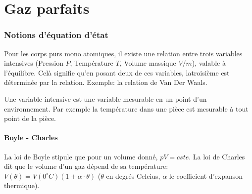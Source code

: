 






\usepackage[hideerrors]{xcolor}
\usepackage{array}
\usepackage{amsmath}
\usepackage{amssymb}
\usepackage{amsthm}
\usepackage{fancybox}
\usepackage{float}
\usepackage{colortbl}
\usepackage{graphicx}

\DeclareMathOperator{\Sur}{Sur}
\DeclareMathOperator{\In}{In}
\DeclareMathOperator{\newnull}{null}
\DeclareMathOperator{\newim}{Im}
\DeclareMathOperator{\newker}{Ker}
\DeclareMathOperator{\cof}{cof}
\DeclareMathOperator{\rang}{rang}




\part{Gaz parfaits}
\section{Notions d'équation d'état}
Pour les corps purs mono atomiques, il existe une relation entre trois variables intensives (Pression $P$, Température $T$, Volume massique $V/m$), valable à l'équilibre. Celà signifie qu'en posant deux de ces variables, latroisième est déterminée par la relation.
Exemple: la relation de Van Der Waals.

Une variable intensive est une variable mesurable en un point d'un environnement. Par exemple la température dans une pièce est mesurable à tout point de la pièce.

\subsection{Boyle - Charles}
La loi de Boyle stipule que pour un volume donné, $pV = cste$.
La loi de Charles dit que le volume d'un gaz dépend de sa température: $V(\theta) = V(0^\circ C)(1 + \alpha \cdot \theta)$ ($\theta$ en degrés Celcius, $\alpha$ le coefficient d'expanson thermique).


